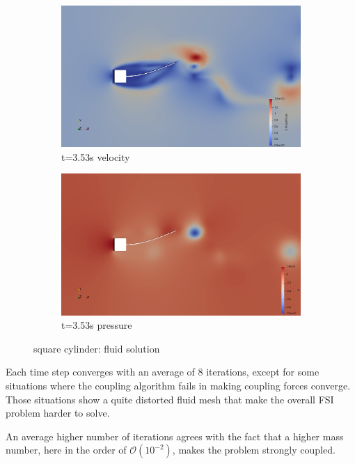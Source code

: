 \begin{figure}[htb]
\begin{subfigure}{0.5\textwidth}
  \includegraphics[width=\linewidth]{images/sq-cyl/sq_v3.png}
  \caption{t=3.53s velocity}
  \label{fig:sq_v3}
\end{subfigure}\hfil %
\begin{subfigure}{0.5\textwidth}
  \includegraphics[width=\linewidth]{images/sq-cyl/sq_p3.png}
  \caption{t=3.53s pressure}
  \label{fig:sq_p3}
\end{subfigure}\hfil %

\caption{square cylinder: fluid solution}
\label{fig:sq_sol}
\end{figure}


Each time step converges with an average of 8 iterations, except for some situations where the coupling algorithm fails in making coupling forces converge. Those situations show a quite distorted fluid mesh that make the overall FSI problem harder to solve.

An average higher number of iterations agrees with the fact that a higher mass number, here in the order of $\mathcal{O} \left(10^{-2} \right) $, makes the problem strongly coupled.

